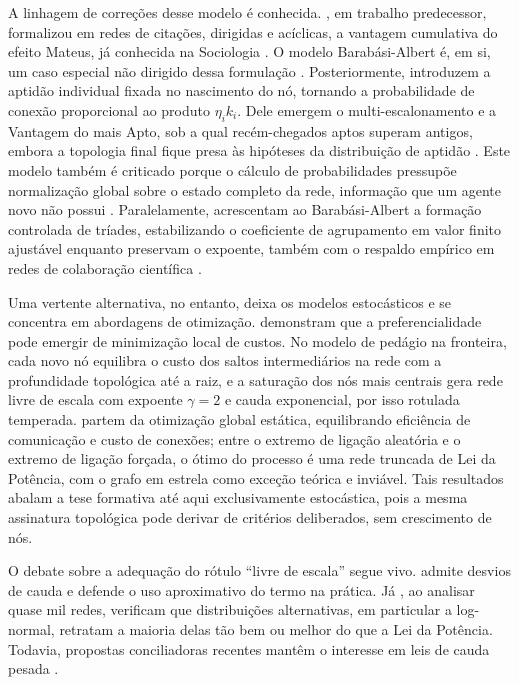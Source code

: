 \documentclass[12pt,oneside,a4paper,brazil,sumario=tradicional]{abntex2}
\begin{document}
A linhagem de correções desse modelo é conhecida. \textcite{price1976}, em trabalho predecessor, formalizou em redes de citações, dirigidas e acíclicas, a vantagem cumulativa do efeito Mateus, já conhecida na Sociologia \parencite{merton1968}. O modelo Barabási-Albert é, em si, um caso especial não dirigido dessa formulação \parencite{newman2003}. Posteriormente, \textcite{bianconi2001} introduzem a aptidão individual fixada no nascimento do nó, tornando a probabilidade de conexão proporcional ao produto $\eta_{i}k_{i}$. Dele emergem o multi-escalonamento e a Vantagem do mais Apto, sob a qual recém-chegados aptos superam antigos, embora a topologia final fique presa às hipóteses da distribuição de aptidão \parencite{bianconi2001}. Este modelo também é criticado porque o cálculo de probabilidades pressupõe normalização global sobre o estado completo da rede, informação que um agente novo não possui \parencite{xu2010}. Paralelamente, \textcite{holme2002} acrescentam ao Barabási-Albert a formação controlada de tríades, estabilizando o coeficiente de agrupamento em valor finito ajustável enquanto preservam o expoente, também com o respaldo empírico em redes de colaboração científica \parencite{newman2003}.

Uma vertente alternativa, no entanto, deixa os modelos estocásticos e se concentra em abordagens de otimização. \textcite{dsouza2007} demonstram que a preferencialidade pode emergir de minimização local de custos. No modelo de pedágio na fronteira, cada novo nó equilibra o custo dos saltos intermediários na rede com a profundidade topológica até a raiz, e a saturação dos nós mais centrais gera rede livre de escala com expoente $\gamma = 2$ e cauda exponencial, por isso rotulada temperada. \textcite{ferrericancho2003} partem da otimização global estática, equilibrando eficiência de comunicação e custo de conexões; entre o extremo de ligação aleatória e o extremo de ligação forçada, o ótimo do processo é uma rede truncada de Lei da Potência, com o grafo em estrela como exceção teórica e inviável. Tais resultados abalam a tese formativa até aqui exclusivamente estocástica, pois a mesma assinatura topológica pode derivar de critérios deliberados, sem crescimento de nós.

O debate sobre a adequação do rótulo “livre de escala” segue vivo. \textcite{newman2003} admite desvios de cauda e defende o uso aproximativo do termo na prática. Já \textcite{broido2019}, ao analisar quase mil redes, verificam que distribuições alternativas, em particular a log-normal, retratam a maioria delas tão bem ou melhor do que a Lei da Potência. Todavia, propostas conciliadoras recentes mantêm o interesse em leis de cauda pesada \parencite{voitalov2019, holme2019}.
\end{document}
